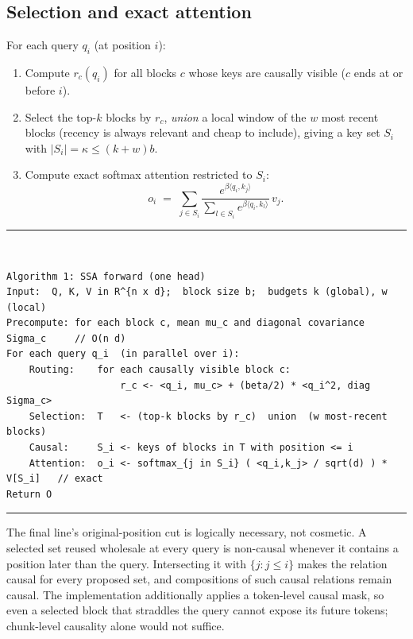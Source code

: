 \documentclass[11pt]{article}
\numberwithin{equation}{section}
\newcommand{\inner}[2]{\langle #1, #2\rangle}
\begin{document}
\subsection{Selection and exact attention}

For each query $q_i$ (at position $i$):
\begin{enumerate}
\item Compute $r_c(q_i)$ for all blocks $c$ whose keys are causally visible ($c$ ends at or before $i$).
\item Select the top-$k$ blocks by $r_c$, \emph{union} a local window of the $w$ most recent blocks (recency is
  always relevant and cheap to include), giving a key set $S_i$ with $\lvert S_i\rvert=\kappa\le(k+w)b$.
\item Compute exact softmax attention restricted to $S_i$:
\begin{equation}\label{eq:exact}
o_i \;=\; \sum_{j\in S_i}\frac{e^{\beta\inner{q_i}{k_j}}}{\sum_{l\in S_i}e^{\beta\inner{q_i}{k_l}}}\,v_j .
\end{equation}
\end{enumerate}

\bigskip
\noindent\rule{\textwidth}{0.6pt}\\[-0.3em]
\begin{footnotesize}
\begin{verbatim}
Algorithm 1: SSA forward (one head)
Input:  Q, K, V in R^{n x d};  block size b;  budgets k (global), w (local)
Precompute: for each block c, mean mu_c and diagonal covariance Sigma_c     // O(n d)
For each query q_i  (in parallel over i):
    Routing:    for each causally visible block c:
                    r_c <- <q_i, mu_c> + (beta/2) * <q_i^2, diag Sigma_c>
    Selection:  T   <- (top-k blocks by r_c)  union  (w most-recent blocks)
    Causal:     S_i <- keys of blocks in T with position <= i
    Attention:  o_i <- softmax_{j in S_i} ( <q_i,k_j> / sqrt(d) ) * V[S_i]   // exact
Return O
\end{verbatim}
\end{footnotesize}
\vspace{-0.6em}\noindent\rule{\textwidth}{0.6pt}
\bigskip

The final line's original-position cut is logically necessary, not cosmetic. A selected set reused wholesale
at every query is non-causal whenever it contains a position later than the query. Intersecting it with
$\{j:j\le i\}$ makes the relation causal for every proposed set, and compositions of such causal relations
remain causal. The implementation additionally applies a token-level causal mask, so even a selected block
that straddles the query cannot expose its future tokens; chunk-level causality alone would not suffice.
\end{document}
